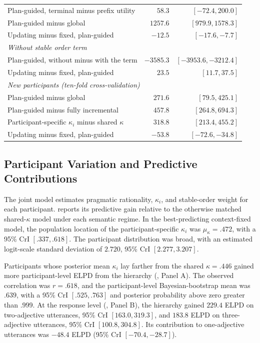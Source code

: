 \documentclass[10pt,a4paper,fleqn]{article}
\begin{document}
\begin{table}[!htbp]
\begin{tabularx}{\textwidth}{X r r}
Plan-guided, terminal minus prefix utility & $58.3$ & $[-72.4, 200.0]$ \\
Plan-guided minus global & $1257.6$ & $[979.9, 1578.3]$ \\
Updating minus fixed, plan-guided & $-12.5$ & $[-17.6, -7.7]$ \\
\midrule
\multicolumn{3}{l}{\emph{Without stable order term}} \\
Plan-guided, without minus with the term & $-3585.3$ & $[-3953.6, -3212.4]$ \\
Updating minus fixed, plan-guided & $23.5$ & $[11.7, 37.5]$ \\
\midrule
\multicolumn{3}{l}{\emph{New participants (ten-fold cross-validation)}} \\
Plan-guided minus global & $271.6$ & $[79.5, 425.1]$ \\
Plan-guided minus fully incremental & $457.8$ & $[264.8, 694.3]$ \\
Participant-specific $\kappa_i$ minus shared $\kappa$ & $318.8$ & $[213.4, 455.2]$ \\
Updating minus fixed, plan-guided & $-53.8$ & $[-72.6, -34.8]$ \\
\bottomrule
\end{tabularx}
\end{table}

\FloatBarrier

\subsection{Participant Variation and Predictive Contributions}
\label{sec:appendix:participant-audit}

The joint model estimates pragmatic rationality, $\kappa_i$, and stable-order weight for each participant.
 reports its predictive gain relative to the otherwise matched shared-$\kappa$ model under each semantic regime.
In the best-predicting context-fixed model, the population location of the participant-specific $\kappa_i$ was $\mu_{\kappa}=.472$, with a 95\% CrI $[.337,.618]$.
The participant distribution was broad, with an estimated logit-scale standard deviation of $2.720$, 95\% CrI $[2.277,3.207]$.

Participants whose posterior mean $\kappa_i$ lay farther from the shared $\kappa=.446$ gained more participant-level ELPD from the hierarchy (, Panel A).
The observed correlation was $r=.618$, and the participant-level Bayesian-bootstrap mean was $.639$, with a 95\% CrI $[.525,.763]$ and posterior probability above zero greater than $.999$.
At the response level (, Panel B), the hierarchy gained $229.4$ ELPD on two-adjective utterances, 95\% CrI $[163.0,319.3]$, and $183.8$ ELPD on three-adjective utterances, 95\% CrI $[100.8,304.8]$.
Its contribution to one-adjective utterances was $-48.4$ ELPD (95\% CrI $[-70.4,-28.7]$).
\end{document}
